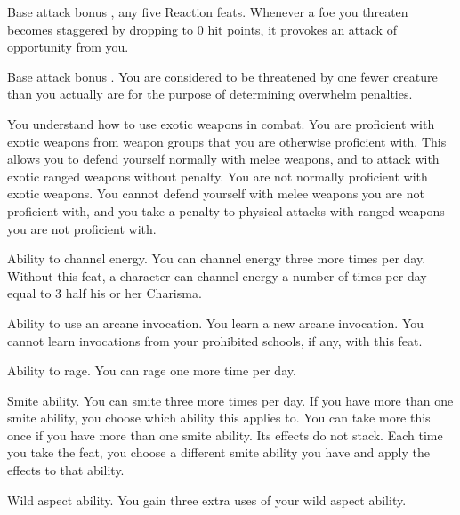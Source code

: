  Base attack bonus , any five Reaction feats.
 Whenever a foe you threaten becomes staggered by dropping to 0 hit points, it provokes an attack of opportunity from you.

 Base attack bonus .
 You are considered to be threatened by one fewer creature than you actually are for the purpose of determining overwhelm penalties.

You understand how to use exotic weapons in combat.
 You are proficient with exotic weapons from weapon groups that you are otherwise proficient with. This allows you to defend yourself normally with melee weapons, and to attack with exotic ranged weapons without penalty.
 You are not normally proficient with exotic weapons. You cannot defend yourself with melee weapons you are not proficient with, and you take a  penalty to physical attacks with ranged weapons you are not proficient with.

 Ability to channel energy.
 You can channel energy three more times per day.
 Without this feat, a character can channel energy a number of times per day equal to 3 \add half his or her Charisma.

 Ability to use an arcane invocation.
 You learn a new arcane invocation. You cannot learn invocations from your prohibited schools, if any, with this feat.

 Ability to rage.
 You can rage one more time per day.

 Smite ability.
 You can smite three more times per day. If you have more than one smite ability, you choose which ability this applies to.
 You can take more this once if you have more than one smite ability. Its effects do not stack. Each time you take the feat, you choose a different smite ability you have and apply the effects to that ability.

 Wild aspect ability.
 You gain three extra uses of your wild aspect ability.

